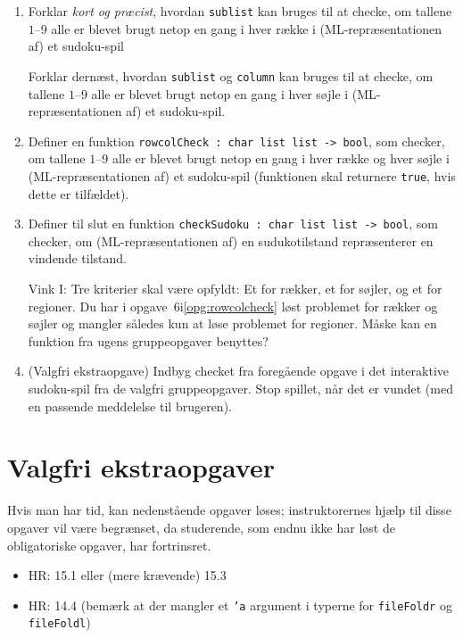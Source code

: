 \documentclass[a4paper]{article}
\begin{document}
\begin{enumerate}[{6I}1]
\item{Forklar \emph{kort og pr{\ae}cist}, hvordan \texttt{sublist} kan bruges til at checke,
om tallene $1$--$9$ alle er blevet brugt netop en gang i hver r{\ae}kke i (ML-repr{\ae}sentationen af) et sudoku-spil

Forklar dern{\ae}st, hvordan \texttt{sublist} og \texttt{column} kan bruges til at checke, om tallene
$1$--$9$ alle er blevet brugt netop en gang i hver s{\o}jle i (ML-repr{\ae}sentationen af) et sudoku-spil.}

\item{\label{opg:rowcolcheck}
Definer en funktion \texttt{rowcolCheck :\ char list list -> bool}, som checker,
om tallene $1$--$9$ alle er blevet brugt netop en gang i hver r{\ae}kke og hver s{\o}jle i (ML-repr{\ae}sentationen af) et sudoku-spil (funktionen skal returnere \texttt{true}, hvis dette er tilf{\ae}ldet).}

\item{Definer til slut en funktion \texttt{checkSudoku :\ char list list -> bool},
som checker, om (ML-re\-pr{\ae}\-sen\-ta\-ti\-o\-nen af) en sudukotilstand repr{\ae}senterer en vindende tilstand.

Vink I: Tre kriterier skal v{\ae}re opfyldt: Et for r{\ae}kker, et for s{\o}jler, og et for regioner. Du har i opgave~6i\ref{opg:rowcolcheck}
l{\o}st problemet for r{\ae}kker og s{\o}jler og mangler s{\aa}ledes kun at l{\o}se problemet for regioner. M{\aa}ske kan en funktion fra ugens gruppeopgaver benyttes?}

\item{ (Valgfri ekstraopgave) Indbyg checket fra foreg{\aa}ende opgave i det interaktive sudoku-spil
fra de valgfri gruppeopgaver. Stop spillet, n{\aa}r det er vundet (med en passende meddelelse til brugeren).}

\end{enumerate}






\section{Valgfri ekstraopgaver}

Hvis man har tid, kan nedenst{\aa}ende opgaver l{\o}ses; instruktorernes hj{\ae}lp
til disse opgaver vil v{\ae}re begr{\ae}nset, da studerende, som endnu ikke har l{\o}st de obligatoriske opgaver, har fortrinsret.

\begin{itemize}
\item HR: 15.1 eller (mere krævende) 15.3
\item HR: 14.4 (bemærk at der mangler et \texttt{'a} argument i typerne for \texttt{fileFoldr} og \texttt{fileFoldl})
\end{itemize}
\end{document}
